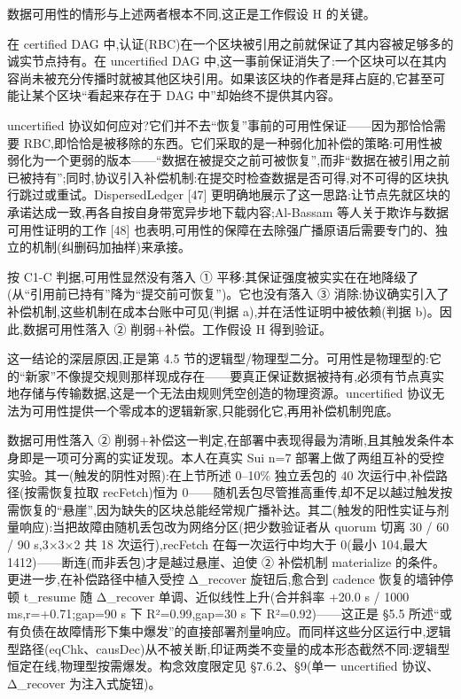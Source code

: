 \documentclass[UTF8,fontset=windows,a4paper,11pt]{ctexart}
\begin{document}
数据可用性的情形与上述两者根本不同,这正是工作假设 H 的关键。

在 certified DAG
中,认证(RBC)在一个区块被引用之前就保证了其内容被足够多的诚实节点持有。在
uncertified DAG
中,这一事前保证消失了:一个区块可以在其内容尚未被充分传播时就被其他区块引用。如果该区块的作者是拜占庭的,它甚至可能让某个区块``看起来存在于
DAG 中''却始终不提供其内容。

uncertified
协议如何应对?它们并不去``恢复''事前的可用性保证------因为那恰恰需要
RBC,即恰恰是被移除的东西。它们采取的是一种弱化加补偿的策略:可用性被弱化为一个更弱的版本------``数据在被提交之前可被恢复'',而非``数据在被引用之前已被持有'';同时,协议引入补偿机制:在提交时检查数据是否可得,对不可得的区块执行跳过或重试。DispersedLedger
{[}47{]}
更明确地展示了这一思路:让节点先就区块的承诺达成一致,再各自按自身带宽异步地下载内容;Al-Bassam
等人关于欺诈与数据可用性证明的工作 {[}48{]}
也表明,可用性的保障在去除强广播原语后需要专门的、独立的机制(纠删码加抽样)来承接。

按 C1-C 判据,可用性显然没有落入 ①
平移:其保证强度被实实在在地降级了(从``引用前已持有''降为``提交前可恢复'')。它也没有落入
③ 消除:协议确实引入了补偿机制,这些机制在成本台账中可见(判据
a),并在活性证明中被依赖(判据 b)。因此,数据可用性落入 ②
削弱+补偿。工作假设 H 得到验证。

这一结论的深层原因,正是第 4.5
节的逻辑型/物理型二分。可用性是物理型的:它的``新家''不像提交规则那样现成存在------要真正保证数据被持有,必须有节点真实地存储与传输数据,这是一个无法由规则凭空创造的物理资源。uncertified
协议无法为可用性提供一个零成本的逻辑新家,只能弱化它,再用补偿机制兜底。

数据可用性落入 ②
削弱+补偿这一判定,在部署中表现得最为清晰,且其触发条件本身即是一项可分离的实证发现。本人在真实
Sui n=7 部署上做了两组互补的受控实验。其一(触发的阴性对照):在上节所述
0--10\% 独立丢包的 40 次运行中,补偿路径(按需恢复拉取 recFetch)恒为
0------随机丢包尽管推高重传,却不足以越过触发按需恢复的``悬崖'',因为缺失的区块总能经常规广播补达。其二(触发的阳性实证与剂量响应):当把故障由随机丢包改为网络分区(把少数验证者从
quorum 切离 30 / 60 / 90 s,3×3×2 共 18 次运行),recFetch
在每一次运行中均大于 0(最小 104,最大
1412)------断连(而非丢包)才是越过悬崖、迫使 ② 补偿机制 materialize
的条件。更进一步,在补偿路径中植入受控 Δ\_recover 旋钮后,愈合到 cadence
恢复的墙钟停顿 t\_resume 随 Δ\_recover 单调、近似线性上升(合并斜率 +20.0
s / 1000 ms,r=+0.71;gap=90 s 下 R²=0.99,gap=30 s 下 R²=0.92)------这正是
§5.5
所述``或有负债在故障情形下集中爆发''的直接部署剂量响应。而同样这些分区运行中,逻辑型路径(eqChk、causDec)从不被关断,印证两类不变量的成本形态截然不同:逻辑型恒定在线,物理型按需爆发。构念效度限定见
§7.6.2、§9(单一 uncertified 协议、Δ\_recover 为注入式旋钮)。
\end{document}
